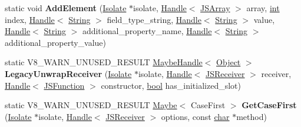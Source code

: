 \begin{DoxyCompactItemize}
\item 
\mbox{\label{classv8_1_1internal_1_1Intl_a9f6b9f6a7c644301b4fa9f8e93424b57}} 
static void {\bfseries Add\+Element} (\mbox{\hyperlink{classv8_1_1internal_1_1Isolate}{Isolate}} $\ast$isolate, \mbox{\hyperlink{classv8_1_1internal_1_1Handle}{Handle}}$<$ \mbox{\hyperlink{classv8_1_1internal_1_1JSArray}{J\+S\+Array}} $>$ array, \mbox{\hyperlink{classint}{int}} index, \mbox{\hyperlink{classv8_1_1internal_1_1Handle}{Handle}}$<$ \mbox{\hyperlink{classv8_1_1internal_1_1String}{String}} $>$ field\+\_\+type\+\_\+string, \mbox{\hyperlink{classv8_1_1internal_1_1Handle}{Handle}}$<$ \mbox{\hyperlink{classv8_1_1internal_1_1String}{String}} $>$ value, \mbox{\hyperlink{classv8_1_1internal_1_1Handle}{Handle}}$<$ \mbox{\hyperlink{classv8_1_1internal_1_1String}{String}} $>$ additional\+\_\+property\+\_\+name, \mbox{\hyperlink{classv8_1_1internal_1_1Handle}{Handle}}$<$ \mbox{\hyperlink{classv8_1_1internal_1_1String}{String}} $>$ additional\+\_\+property\+\_\+value)
\item 
\mbox{\label{classv8_1_1internal_1_1Intl_a5ef61cc82b38dfa1069a298b6e62858b}} 
static V8\+\_\+\+W\+A\+R\+N\+\_\+\+U\+N\+U\+S\+E\+D\+\_\+\+R\+E\+S\+U\+LT \mbox{\hyperlink{classv8_1_1internal_1_1MaybeHandle}{Maybe\+Handle}}$<$ \mbox{\hyperlink{classv8_1_1internal_1_1Object}{Object}} $>$ {\bfseries Legacy\+Unwrap\+Receiver} (\mbox{\hyperlink{classv8_1_1internal_1_1Isolate}{Isolate}} $\ast$isolate, \mbox{\hyperlink{classv8_1_1internal_1_1Handle}{Handle}}$<$ \mbox{\hyperlink{classv8_1_1internal_1_1JSReceiver}{J\+S\+Receiver}} $>$ receiver, \mbox{\hyperlink{classv8_1_1internal_1_1Handle}{Handle}}$<$ \mbox{\hyperlink{classv8_1_1internal_1_1JSFunction}{J\+S\+Function}} $>$ constructor, \mbox{\hyperlink{classbool}{bool}} has\+\_\+initialized\+\_\+slot)
\item 
\mbox{\label{classv8_1_1internal_1_1Intl_a3f6f855e9db35af42a9d148c265f4fd4}} 
static V8\+\_\+\+W\+A\+R\+N\+\_\+\+U\+N\+U\+S\+E\+D\+\_\+\+R\+E\+S\+U\+LT \mbox{\hyperlink{classv8_1_1Maybe}{Maybe}}$<$ Case\+First $>$ {\bfseries Get\+Case\+First} (\mbox{\hyperlink{classv8_1_1internal_1_1Isolate}{Isolate}} $\ast$isolate, \mbox{\hyperlink{classv8_1_1internal_1_1Handle}{Handle}}$<$ \mbox{\hyperlink{classv8_1_1internal_1_1JSReceiver}{J\+S\+Receiver}} $>$ options, const \mbox{\hyperlink{classchar}{char}} $\ast$method)
\item 

\end{DoxyCompactItemize}
